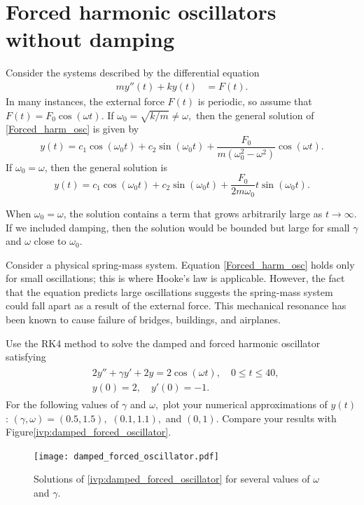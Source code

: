 \section*{Forced harmonic oscillators without damping}
Consider the systems described by the differential equation
\begin{align}
my''(t)  + ky(t) &= F(t). \label{Forced_harm_osc}
\end{align}
In many instances, the external force $F(t)$ is periodic, so assume that $F(t) = F_0 \cos(\omega t)$. 
If $\omega_0 = \sqrt{k/m} \not = \omega,$ then the  general solution of \ref{Forced_harm_osc} is given by
\[y(t) = c_1 \cos (\omega_0 t) + c_2\sin (\omega_0 t) + \frac{F_0}{m(\omega_0^2 - \omega^2)} \cos (\omega t).\]
If $\omega_0 = \omega$, then the general solution is
\[y(t) = c_1 \cos (\omega_0 t) + c_2\sin (\omega_0 t) + \frac{F_0}{2m\omega_0} t \sin (\omega_0 t).\]

When $\omega_0 = \omega$, the solution contains a term that grows arbitrarily large as $t \to \infty$.
If we included damping, then the solution would be bounded but large for small $\gamma$ and $\omega$ close to $\omega_0$.

Consider a physical spring-mass system.
Equation \ref{Forced_harm_osc} holds only for small oscillations; this is where Hooke's law is applicable.
However, the fact that the equation predicts large oscillations suggests the spring-mass system could fall apart as a result of the external force. 
This mechanical resonance has been known to cause failure of bridges, buildings, and airplanes.

\begin{problem}
Use the RK4 method to solve the damped and forced harmonic oscillator satisfying 
\begin{align}
	\begin{split}
&{}2y'' + \gamma y' + 2y = 2 \cos (\omega t), \quad 0 \leq t \leq 40,\\
&{}y(0) = 2, \quad
y'(0) = -1. 
	\end{split}
	\label{ivp:damped_forced_oscillator}
\end{align}
For the following values of $\gamma$ and $\omega,$ plot your numerical approximations of $y(t)$: $(\gamma, \omega) = (0.5, 1.5),$ $(0.1, 1.1),$ and $(0, 1)$.
Compare your results with Figure\ref{ivp:damped_forced_oscillator}.
\end{problem}


\begin{figure}[h]
\centering
\texttt{[image: damped\_forced\_oscillator.pdf]}
\caption{Solutions of \eqref{ivp:damped_forced_oscillator} for several values of $\omega$ and $\gamma$.}
\label{ivp:damped_forced_oscillator_figure}
\end{figure}
